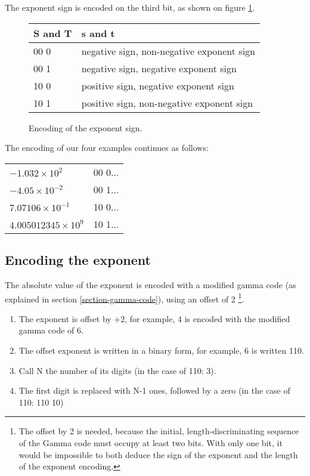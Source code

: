 \documentclass{acm_proc_article-sp}
\begin{document}
The exponent sign is encoded on the third bit, as shown on figure \ref{figure-exponent-sign}.

\begin{figure}
\caption{Encoding of the exponent sign.}
\label{figure-exponent-sign}
\center
\begin{tabular}{|l|l|}
\hline
S and T & s and t \\
\hline
00 0 &  negative sign, non-negative exponent sign\\
\hline
00 1 & negative sign, negative exponent sign\\
\hline
10 0 & positive sign, negative exponent sign\\
\hline
10 1 & positive sign, non-negative exponent sign\\
\hline
\end{tabular}
\end{figure}

The encoding of our four examples continues as follows:

\begin{tabular}{l|l}
$- 1.032 \times 10^2$ & 00 0... \\

$-4.05 \times 10^{-2}$ & 00 1... \\

$7.07106 \times 10^{-1}$ & 10 0... \\

$4.005012345 \times 10^9$ & 10 1...\\
\end{tabular}

\vspace{10pt}
\subsection{Encoding the exponent}

The absolute value of the exponent is encoded with a modified gamma code (as explained in section \ref{section-gamma-code}), using an offset of 2 \footnote{The offset by 2 is needed, because the initial, length-discriminating sequence of the Gamma code must occupy at least two bits. With only one bit, it would be impossible to both deduce the sign of the exponent and the length of the exponent encoding.}.

\label{section-exponent-encoding}
\begin{enumerate}
\item The exponent is offset by +2, for example, 4 is encoded with the modified gamma code of 6. 
\item  The offset exponent is written in a binary form, for example, 6 is written 110.
\item  Call N the number of its digits (in the case of 110: 3).
\item  The first digit is replaced with N-1 ones, followed by a zero (in the case of 110: 110 10)
\end{enumerate}
\end{document}
